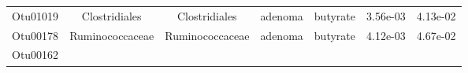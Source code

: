 \documentclass[11pt,]{article}
\begin{document}
\begin{longtable}[]{@{}ccccccc@{}}
\begin{minipage}[t]{0.09\columnwidth}\centering\strut
Otu01019\strut
\end{minipage} & \begin{minipage}[t]{0.17\columnwidth}\centering\strut
Clostridiales\strut
\end{minipage} & \begin{minipage}[t]{0.17\columnwidth}\centering\strut
Clostridiales\strut
\end{minipage} & \begin{minipage}[t]{0.09\columnwidth}\centering\strut
adenoma\strut
\end{minipage} & \begin{minipage}[t]{0.11\columnwidth}\centering\strut
butyrate\strut
\end{minipage} & \begin{minipage}[t]{0.09\columnwidth}\centering\strut
3.56e-03\strut
\end{minipage} & \begin{minipage}[t]{0.09\columnwidth}\centering\strut
4.13e-02\strut
\end{minipage}\tabularnewline
\begin{minipage}[t]{0.09\columnwidth}\centering\strut
Otu00178\strut
\end{minipage} & \begin{minipage}[t]{0.17\columnwidth}\centering\strut
Ruminococcaceae\strut
\end{minipage} & \begin{minipage}[t]{0.17\columnwidth}\centering\strut
Ruminococcaceae\strut
\end{minipage} & \begin{minipage}[t]{0.09\columnwidth}\centering\strut
adenoma\strut
\end{minipage} & \begin{minipage}[t]{0.11\columnwidth}\centering\strut
butyrate\strut
\end{minipage} & \begin{minipage}[t]{0.09\columnwidth}\centering\strut
4.12e-03\strut
\end{minipage} & \begin{minipage}[t]{0.09\columnwidth}\centering\strut
4.67e-02\strut
\end{minipage}\tabularnewline
\begin{minipage}[t]{0.09\columnwidth}\centering\strut
Otu00162\strut
\end{minipage} & \begin{minipage}[t]{0.17\columnwidth}\centering\strut

\end{minipage}
\end{longtable}
\end{document}
